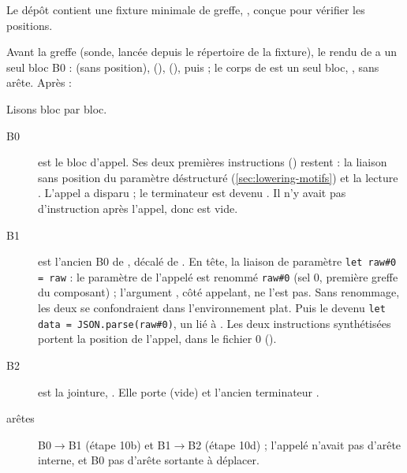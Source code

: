 Le dépôt contient une fixture minimale de greffe, , conçue pour vérifier les positions.


Avant la greffe (sonde, lancée depuis le répertoire de la fixture), le rendu de  a un seul bloc B0 :  (sans position),  (),  (), puis  ; le corps de  est un seul bloc, , sans arête. Après :


Lisons bloc par bloc.
\begin{description}
  \item[B0] est le bloc d'appel. Ses deux premières instructions () restent : la liaison sans position du paramètre déstructuré (\cref{sec:lowering-motifs}) et la lecture . L'appel  a disparu ; le terminateur est devenu . Il n'y avait pas d'instruction après l'appel, donc  est vide.
  \item[B1] est l'ancien B0 de , décalé de . En tête, la liaison de paramètre \texttt{let raw\#0 = raw} : le paramètre de l'appelé est renommé \texttt{raw\#0} (sel 0, première greffe du composant) ; l'argument , côté appelant, ne l'est pas. Sans renommage, les deux  se confondraient dans l'environnement plat. Puis le  devenu \texttt{let data = JSON.parse(raw\#0)}, un  lié à . Les deux instructions synthétisées portent la position de l'appel,  dans le fichier 0 ().
  \item[B2] est la jointure, . Elle porte  (vide) et l'ancien terminateur .
  \item[arêtes] B0$\to$B1 (étape 10b) et B1$\to$B2 (étape 10d) ; l'appelé n'avait pas d'arête interne, et B0 pas d'arête sortante à déplacer.
\end{description}

